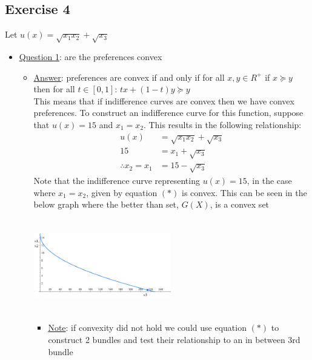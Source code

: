 \documentclass{article}
\begin{document}
\par
\vspace{6mm}
\subsection{Exercise 4}
Let $u(x) = \sqrt{x_{1}x_{2}} + \sqrt{x_{3}}$
\par \vspace{0.3em}
\begin{itemize}
  \item  \underline{Question 1}: are the preferences convex
  \begin{itemize}
    \item  \underline{Answer}: preferences are convex if and only if for all $x,y \in R^{+}$ if $x \succeq y$ then for all $t \in [0,1]$: $tx + (1-t)y \succeq y$ \\ This means that if indifference curves are convex then we have convex preferences. To construct an indifference curve for this function, suppose that $u(x) = 15$ and $x_{1} = x_{2}$. This results in the following relationship:
    \begin{align*}
      u(x) &= \sqrt{x_{1}x_{2}} + \sqrt{x_{3}} \\
      15 &= x_{1} + \sqrt{x_{3}} \\
      \therefore x_{2} = x_{1} &= 15 - \sqrt{x_{3}} \ \tag{*}
    \end{align*}
    Note that the indifference curve representing $u(x) = 15$, in the case where $x_{1} = x_{2}$, given by equation $(*)$ is convex. This can be seen in the below graph where the better than set, $G(X)$, is a convex set \\
    \begin{center}
      \includegraphics[width=6cm, height=4cm]{pic26}
    \end{center}
    \begin{itemize}
      \item  \underline{Note}: if convexity did not hold we could use equation $(*)$ to construct 2 bundles and test their relationship to an in between 3rd bundle
    \end{itemize}

\end{itemize}
\end{itemize}
\end{document}
